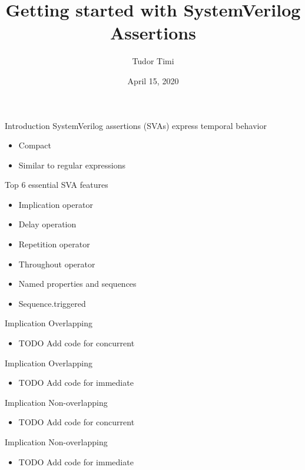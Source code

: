 \documentclass{beamer}
\title{Getting started with SystemVerilog Assertions}
\author{Tudor Timi}
\institute{VerificationGentleman.com}
\date{April 15, 2020}
\begin{document}
\begin{frame}
\titlepage
\end{frame}


\begin{frame}{Introduction}
SystemVerilog assertions (SVAs) express temporal behavior

\begin{itemize}
 \item Compact
 \item Similar to regular expressions
\end{itemize}
\end{frame}


\begin{frame}{Top 6 essential SVA features}
\begin{itemize}
 \item Implication operator
 \item Delay operation
 \item Repetition operator
 \item Throughout operator
 \item Named properties and sequences
 \item Sequence.triggered
\end{itemize}
\end{frame}


\begin{frame}{Implication}
Overlapping

\begin{itemize}
 \item TODO Add code for concurrent
\end{itemize}
\end{frame}


\begin{frame}{Implication}
Overlapping

\begin{itemize}
 \item TODO Add code for immediate
\end{itemize}
\end{frame}


\begin{frame}{Implication}
Non-overlapping

\begin{itemize}
 \item TODO Add code for concurrent
\end{itemize}
\end{frame}


\begin{frame}{Implication}
Non-overlapping

\begin{itemize}
 \item TODO Add code for immediate
\end{itemize}
\end{frame}
\end{document}
